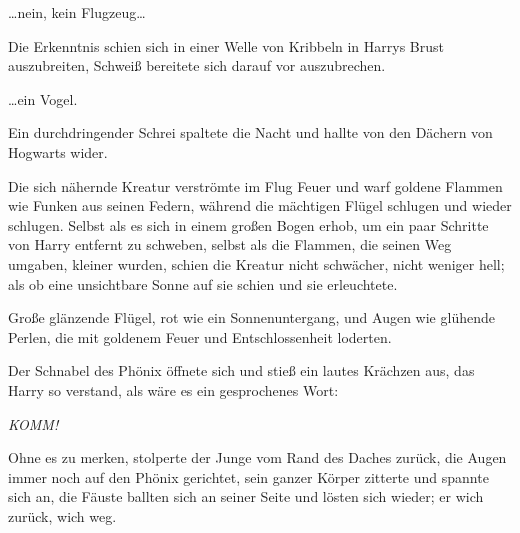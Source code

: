 …nein, kein Flugzeug…

Die Erkenntnis schien sich in einer Welle von Kribbeln in Harrys Brust auszubreiten, Schweiß bereitete sich darauf vor auszubrechen.

…ein Vogel.

Ein durchdringender Schrei spaltete die Nacht und hallte von den Dächern von Hogwarts wider.

Die sich nähernde Kreatur verströmte im Flug Feuer und warf goldene Flammen wie Funken aus seinen Federn, während die mächtigen Flügel schlugen und wieder schlugen. Selbst als es sich in einem großen Bogen erhob, um ein paar Schritte von Harry entfernt zu schweben, selbst als die Flammen, die seinen Weg umgaben, kleiner wurden, schien die Kreatur nicht schwächer, nicht weniger hell; als ob eine unsichtbare Sonne auf sie schien und sie erleuchtete.

Große glänzende Flügel, rot wie ein Sonnenuntergang, und Augen wie glühende Perlen, die mit goldenem Feuer und Entschlossenheit loderten.

Der Schnabel des Phönix öffnete sich und stieß ein lautes Krächzen aus, das Harry so verstand, als wäre es ein gesprochenes Wort:

\emph{KOMM!}

Ohne es zu merken, stolperte der Junge vom Rand des Daches zurück, die Augen immer noch auf den Phönix gerichtet, sein ganzer Körper zitterte und spannte sich an, die Fäuste ballten sich an seiner Seite und lösten sich wieder; er wich zurück, wich weg.

